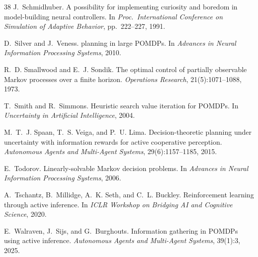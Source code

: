 \documentclass[runningheads]{llncs}
\begin{document}
\begin{thebibliography}{38}
J.~Schmidhuber.
\newblock A possibility for implementing curiosity and boredom in model-building neural controllers.
\newblock In \emph{Proc.\ International Conference on Simulation of Adaptive Behavior}, pp.\ 222--227, 1991.

D.~Silver and J.~Veness.
 planning in large {POMDP}s.
\newblock In \emph{Advances in Neural Information Processing Systems}, 2010.

R.~D. Smallwood and E.~J. Sondik.
\newblock The optimal control of partially observable {M}arkov processes over a finite horizon.
\newblock \emph{Operations Research}, 21(5):1071--1088, 1973.

T.~Smith and R.~Simmons.
\newblock Heuristic search value iteration for {POMDP}s.
\newblock In \emph{Uncertainty in Artificial Intelligence}, 2004.

M.~T.~J. Spaan, T.~S. Veiga, and P.~U. Lima.
\newblock Decision-theoretic planning under uncertainty with information rewards for active cooperative perception.
\newblock \emph{Autonomous Agents and Multi-Agent Systems}, 29(6):1157--1185, 2015.

E.~Todorov.
\newblock Linearly-solvable {M}arkov decision problems.
\newblock In \emph{Advances in Neural Information Processing Systems}, 2006.

A.~Tschantz, B.~Millidge, A.~K. Seth, and C.~L. Buckley.
\newblock Reinforcement learning through active inference.
\newblock In \emph{ICLR Workshop on Bridging AI and Cognitive Science}, 2020.

E.~Walraven, J.~Sijs, and G.~Burghouts.
\newblock Information gathering in {POMDP}s using active inference.
\newblock \emph{Autonomous Agents and Multi-Agent Systems}, 39(1):3, 2025.

\end{thebibliography}
\end{document}
